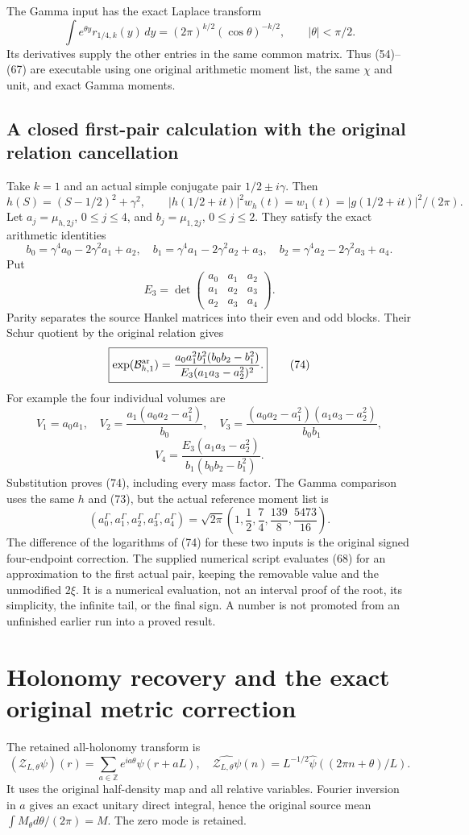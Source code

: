 \documentclass[11pt,a4paper]{article}
\begin{document}
The Gamma input has the exact Laplace transform
\[
 \int e^{\theta y}r_{1/4,k}(y)\,dy
    =(2\pi)^{k/2}(\cos\theta)^{-k/2},\qquad |\theta|<\pi/2.
 \tag{71}
\]
Its derivatives supply the other entries in the same common matrix. Thus (54)--(67) are executable using one original arithmetic moment list, the same $\chi$ and unit, and exact Gamma moments.

\subsection{A closed first-pair calculation with the original relation cancellation}
Take $k=1$ and an actual simple conjugate pair $1/2\pm i\gamma$. Then
\[
 h(S)=(S-1/2)^2+\gamma^2,\qquad
 |h(1/2+it)|^2w_h(t)=w_1(t)=|g(1/2+it)|^2/(2\pi).
 \tag{72}
\]
Let $a_j=\mu_{h,2j}$, $0\le j\le4$, and $b_j=\mu_{1,2j}$, $0\le j\le2$. They satisfy the exact arithmetic identities
\[
 b_0=\gamma^4a_0-2\gamma^2a_1+a_2,
 \quad b_1=\gamma^4a_1-2\gamma^2a_2+a_3,
 \quad b_2=\gamma^4a_2-2\gamma^2a_3+a_4.
 \tag{73}
\]
Put
\[
 E_3=\det\begin{pmatrix}a_0&a_1&a_2\\a_1&a_2&a_3\\a_2&a_3&a_4\end{pmatrix}.
\]
Parity separates the source Hankel matrices into their even and odd blocks. Their Schur quotient by the original relation gives
\[
 \boxed{\exp(\mathcal B^{\rm ar}_{h,1})
 =\frac{a_0a_1^2b_1^2(b_0b_2-b_1^2)}
              {E_3(a_1a_3-a_2^2)^2}.}
 \tag{74}
\]
For example the four individual volumes are
\[
 V_1=a_0a_1,\quad
 V_2=\frac{a_1(a_0a_2-a_1^2)}{b_0},\quad
 V_3=\frac{(a_0a_2-a_1^2)(a_1a_3-a_2^2)}{b_0b_1},
\]
\[
 V_4=\frac{E_3(a_1a_3-a_2^2)}{b_1(b_0b_2-b_1^2)}.
 \tag{75}
\]
Substitution proves (74), including every mass factor. The Gamma comparison uses the same $h$ and (73), but the actual reference moment list is
\[
 (a_0^\Gamma,a_1^\Gamma,a_2^\Gamma,a_3^\Gamma,a_4^\Gamma)
 =\sqrt{2\pi}\left(1,\frac12,\frac74,\frac{139}{8},\frac{5473}{16}\right).
 \tag{76}
\]
The difference of the logarithms of (74) for these two inputs is the original signed four-endpoint correction. The supplied numerical script evaluates (68) for an approximation to the first actual pair, keeping the removable value and the unmodified $2\xi$. It is a numerical evaluation, not an interval proof of the root, its simplicity, the infinite tail, or the final sign. A number is not promoted from an unfinished earlier run into a proved result.

\section{Holonomy recovery and the exact original metric correction}
The retained all-holonomy transform is
\[
 (\mathcal Z_{L,\theta}\psi)(r)
   =\sum_{a\in\mathbb Z}e^{ia\theta}\psi(r+aL),
 \quad\widehat{\mathcal Z_{L,\theta}\psi}(n)
   =L^{-1/2}\widehat\psi((2\pi n+\theta)/L).
 \tag{77}
\]
It uses the original half-density map and all relative variables. Fourier inversion in $a$ gives an exact unitary direct integral, hence the original source mean $\int M_\theta d\theta/(2\pi)=M$. The zero mode is retained.
\end{document}
